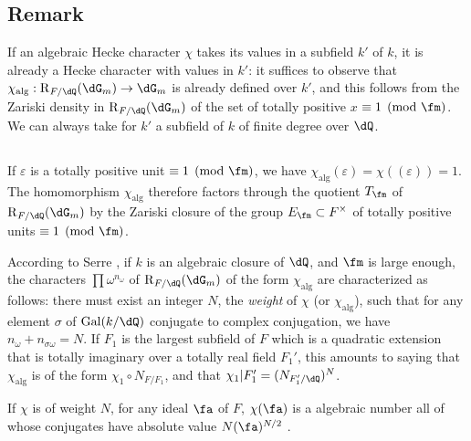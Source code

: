\subsection{Remark}\label{VI:5-4}

If an algebraic Hecke character $\chi$ takes its values in a 
subfield $k'$ of $k$, it is already a Hecke character with values in 
$k'$: it suffices to observe that $\chi_\text{alg}:\res_{F/\dQ}(\dG_m) \to \dG_m$ 
is already defined over $k'$, and this follows from the Zariski density 
in $\res_{F/\dQ}(\dG_m)$ of the set of totally positive $x$ 
$\equiv 1\pmod\fm$. We can always take for $k'$ a subfield of $k$ of 
finite degree over $\dQ$. 





\subsection{}\label{VI:5-5}

If $\varepsilon$ is a totally positive unit $\equiv 1\pmod\fm$, we have 
$\chi_\text{alg}(\varepsilon) = \chi((\varepsilon)) = 1$. The homomorphism 
$\chi_\text{alg}$ therefore factors through the quotient $T_\fm$ of 
$\res_{F/\dQ}(\dG_m)$ by the Zariski closure of the group 
$E_\fm\subset F^\times$ of totally positive units $\equiv 1\pmod\fm$. 

According to Serre \cite[II.3]{se68}, if $k$ is an algebraic closure of 
$\dQ$, and $\fm$ is large enough, the characters $\prod \omega^{n_\omega}$ 
of $\res_{F/\dQ}(\dG_m)$ of the form $\chi_\text{alg}$ are characterized 
as follows: there must exist an integer $N$, the \emph{weight} of $\chi$ (or 
$\chi_\text{alg}$), such that for any element $\sigma$ of $\gal(k/\dQ)$ 
conjugate to complex conjugation, we have $n_\omega+n_{\sigma \omega}=N$. If 
$F_1$ is the largest subfield of $F$ which is a quadratic extension 
that is totally imaginary over a totally real field $F_1'$, this amounts to 
  saying that $\chi_\text{alg}$ is of the form $\chi_1\circ N_{F/F_1}$, and that 
  $\chi_1|F_1'=(N_{F_1'/\dQ})^N$. 

If $\chi$ is of weight $N$, for any ideal $\fa$ of $F$, $\chi(\fa)$ is a 
algebraic number all of whose conjugates have absolute value 
$N(\fa)^{N/2}$ \cite[II.3 prop.2]{se68}. 





\subsection{}\label{VI:5-6}

